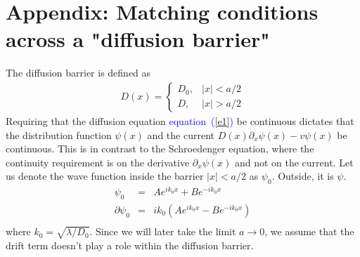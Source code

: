 \documentclass[aps,pre,floats,floatfix,fleqn,notitlepage]{revtex4-1}
\newcommand{\mylabel}[1]{\label{#1}}  %
\newcommand{\beq}{\begin{eqnarray}}
\newcommand{\eeq}{\end{eqnarray}}
\newcommand{\be}[1]{\begin{eqnarray}\ifthenelse{#1=-1}{\nonumber}{\ifthenelse{#1=0}{}{\mylabel{e#1}}}}
\newcommand{\ee}{\end{eqnarray}}
\newcommand{\Eq}[1]{\textcolor{blue}{equation~(\ref{#1})}} %
\begin{document}
%
%
%

\section{Appendix: Matching conditions across a "diffusion barrier"}
The diffusion barrier is defined as 
%
\beq
D(x) = \left\{ \begin{array}{cc}
D_0, & |x|<a/2 \\
D, & |x|>a/2 
\end{array}
\right.
\eeq
%
Requiring that the diffusion equation \Eq{e1} be continuous dictates that 
the distribution function $\psi(x)$ 
and the current $D(x)\partial_x \psi(x)-v\psi(x)$ 
be continuous.
This is in contrast to the Schroedenger equation, 
where the continuity requirement is on the derivative $\partial_x\psi(x)$ and not on the current. 
Let us denote the wave function inside the barrier $|x|<a/2$ as $\psi_0$. Outside, it is $\psi$.
%
\beq
\psi_0 &=& A e^{ik_0x} + Be^{-ik_0x} \\
\partial \psi_0 &=& ik_0\left(A e^{ik_0x} - Be^{-ik_0x}\right) \\
\eeq
%
where $k_0 = \sqrt{\lambda/D_0}$.
Since we will later take the limit $a\to 0$, we assume that the drift term doesn't play a role within the diffusion barrier. 
\end{document}
